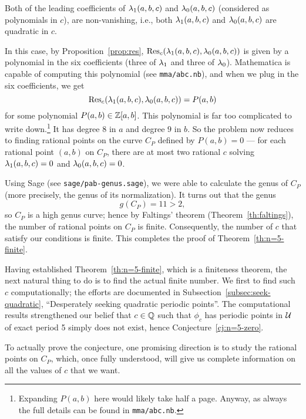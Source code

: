 \begin{case}
  Both of the leading coefficients of $\lambda_1(a, b, c)$ and $\lambda_0(a, b,
  c)$ (considered as polynomials in $c$), are non-vanishing, i.e.,
  both $\lambda_1(a, b, c)$ and $\lambda_0(a, b, c)$ are quadratic in $c$.

  In this case, by Proposition~\ref{prop:res}, $\mathrm{Res}_c(\lambda_1(a, b, c),
  \lambda_0(a, b, c))$ is given by a polynomial in the six coefficients
  (three of $\lambda_1$ and three of $\lambda_0$). Mathematica is capable of
  computing this polynomial (see \texttt{mma/abc.nb}), and when we
  plug in the six coefficients, we get
  \[
  \label{eq:pab}
  \mathrm{Res}_c(\lambda_1(a, b, c), \lambda_0(a, b, c)) = P(a, b)
  \]
  for some polynomial $P(a, b) \in \mathbb{Z}[a, b]$. This polynomial is far
  too complicated to write down.\footnote{%
    Expanding $P(a, b)$ here would likely take half a page. Anyway,
    as always the full details can be found in \texttt{mma/abc.nb}.}
  It has degree $8$ in $a$ and degree $9$ in $b$. So the problem now
  reduces to finding rational points on the curve $C_P$ defined by
  $P(a, b) = 0$ --- for each rational point $(a, b)$ on $C_P$, there
  are at most two rational $c$ solving $\lambda_1(a, b, c) = 0$ and
  $\lambda_0(a, b, c) = 0$.

  Using Sage (see \texttt{sage/pab-genus.sage}), we were able to
  calculate the genus of $C_P$ (more precisely, the genus of its
  normalization). It turns out that the genus
  \[
  g(C_P) = 11 > 2,
  \]
  so $C_P$ is a high genus curve; hence by Faltings' theorem
  (Theorem~\ref{th:faltings}), the number of rational points on $C_P$
  is finite. Consequently, the number of $c$ that satisfy our
  conditions is finite. This completes the proof of
  Theorem~\ref{th:n=5-finite}.
\end{case}

Having established Theorem~\ref{th:n=5-finite}, which is a finiteness
theorem, the next natural thing to do is to find the actual finite
number. We first to find such $c$ computationally; the efforts are
documented in Subsection~\ref{subsec:seek-quadratic}, ``Desperately
seeking quadratic periodic points''. The computational results
strengthened our belief that $c \in \mathbb{Q}$ such that $\phi_c$ has
periodic points in $\mathcal{U}$ of exact period 5 simply does not exist, hence
Conjecture~\ref{cj:n=5-zero}.

To actually prove the conjecture, one promising direction is to study
the rational points on $C_P$, which, once fully understood, will give
us complete information on all the values of $c$ that we want.

